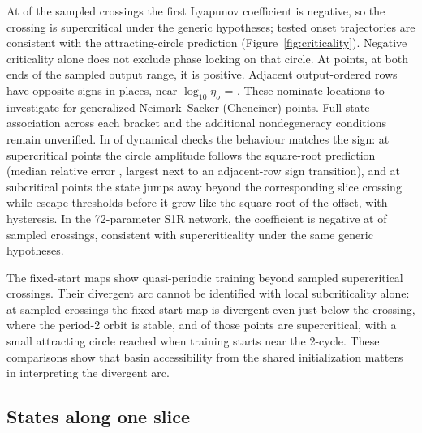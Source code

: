 \documentclass[11pt,letterpaper]{article}
\begin{document}
At \nCritSuper{} of the \nCritPoints{} sampled crossings the first Lyapunov coefficient is negative, so the crossing is
supercritical under the generic hypotheses; tested onset trajectories are consistent with the attracting-circle prediction
(Figure~\ref{fig:criticality}). Negative criticality alone does not exclude phase locking on that circle. At \nCritSub{} points,
at both ends of the sampled output range, it is positive. Adjacent output-ordered rows have opposite signs
in \nChenciner{} places, near $\log_{10}\eta_o$ = \tChenciner{}. These nominate locations to investigate for
generalized Neimark--Sacker (Chenciner) points. Full-state association across each bracket and the additional
nondegeneracy conditions remain unverified. In \nDynConsistent{} of \nDynChecks{} dynamical checks the
behaviour matches the sign: at supercritical points the circle amplitude follows the square-root prediction (median
relative error \pDynMedianError{}, largest \pDynMaxError{} next to an adjacent-row sign transition), and at subcritical points the state
jumps away beyond the corresponding slice crossing while escape thresholds before it grow like the square root of the offset, with
hysteresis. In the 72-parameter S1R network, the coefficient is negative at \nCritSOneRSuper{} of \nCritSOneR{} sampled crossings,
consistent with supercriticality under the same generic hypotheses.

The fixed-start maps show quasi-periodic training beyond sampled supercritical crossings. Their divergent arc
cannot be identified with local subcriticality alone: at \nBasinPoints{} sampled crossings the fixed-start map is divergent
even just below the crossing, where the period-2 orbit is stable, and \nBasinSuper{} of those points are
supercritical, with a small attracting circle reached when training starts near the 2-cycle. These comparisons
show that basin accessibility from the shared initialization matters in interpreting the divergent arc.

\subsection{States along one slice}
\end{document}
